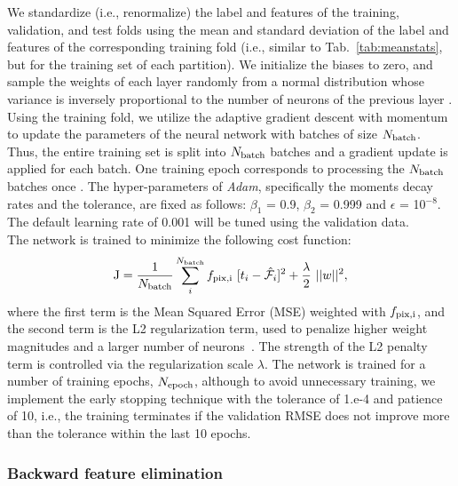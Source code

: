 \documentclass[fleqn, usenatbib]{mnras}
\begin{document}
     
We standardize (i.e., renormalize) the label and features of the training, validation, and test folds using the mean and standard deviation of the label and features of the corresponding training fold (i.e., similar to Tab.~\ref{tab:meanstats}, but for the training set of each partition). We initialize the biases to zero, and sample the weights of each layer randomly from a normal distribution whose variance is inversely proportional to the number of neurons of the previous layer \citep[see e.g.,][]{he2015delving}. Using the training fold, we utilize the adaptive gradient descent with momentum \citep[\textit{Adam},][]{kingma2014adam} to update the parameters of the neural network with batches of size $N_{{\rm batch}}$. Thus, the entire training set is split into $N_{{\rm batch}}$ batches and a gradient update is applied for each batch. One training epoch corresponds to processing the $N_{{\rm batch}}$ batches once \citep[for more details on the training procedure, we refer the reader to see e.g.,][]{ruder2016overview}. The hyper-parameters of \textit{Adam}, specifically the moments decay rates and the tolerance, are fixed as follows: $\beta_{1}$ = 0.9, $\beta_{2}$ = 0.999 and $\epsilon$ = 10$^{-8}$. The default learning rate of 0.001 will be tuned using the validation data.\\ 

The network is trained to minimize the following cost function:
\begin{equation}\label{eq:cost}
    \text{J} = \frac{1}{N_{{\rm batch}}}\sum_{i}^{N_{{\rm batch}}}f_{\rm pix, i}~[t_{i} - \hat{\mathcal{F}_{i}}]^{2} + \frac{\lambda}{2} ~ ||w||^{2} ,
\end{equation}   
%
where the first term is the Mean Squared Error (MSE) weighted with $f_{\rm pix,i}$, and the second term is the L2 regularization term, used to penalize higher weight magnitudes and a larger number of neurons~\citep{hoerl1970ridge}. The strength of the L2 penalty term is controlled via the regularization scale $\lambda$. The network is trained for a number of training epochs, $N_{{\rm epoch}}$, although to avoid unnecessary training, we implement the early stopping technique with the tolerance of 1.e-4 and patience of 10, i.e., the training terminates if the validation RMSE does not improve more than the tolerance within the last 10 epochs.\\

\subsubsection{Backward feature elimination}
    
\end{document}
